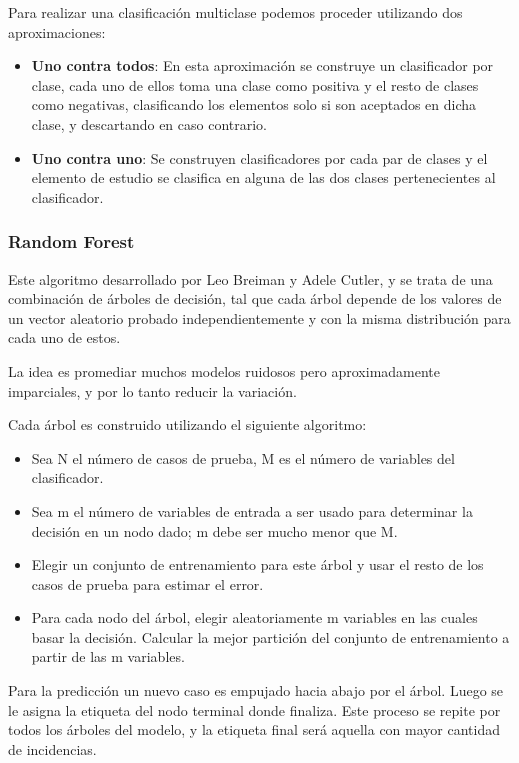 Para realizar una clasificación multiclase podemos proceder utilizando dos aproximaciones:

\begin{itemize}
	\item \textbf{Uno contra todos}: En esta aproximación se construye un clasificador por clase, cada uno de ellos toma una clase como positiva y el resto de clases como negativas, clasificando los elementos solo si son aceptados en dicha clase, y descartando en caso contrario.
	\item \textbf{Uno contra uno}: Se construyen clasificadores por cada par de clases y el elemento de estudio se clasifica en alguna de las dos clases pertenecientes al clasificador.
\end{itemize}

\subsubsection{Random Forest}\label{rf}

Este algoritmo desarrollado por Leo Breiman y Adele Cutler, y se trata de una combinación de árboles de decisión, tal que cada árbol depende de los valores de un vector aleatorio probado independientemente y con la misma distribución para cada uno de estos.

La idea es promediar muchos modelos ruidosos pero aproximadamente imparciales, y por lo tanto reducir la variación.

Cada árbol es construido utilizando el siguiente algoritmo:
\begin{itemize}
	\item Sea N el número de casos de prueba, M es el número de variables del clasificador.
	\item Sea m el número de variables de entrada a ser usado para determinar la decisión en un nodo dado; m debe ser mucho menor que M.
	\item Elegir un conjunto de entrenamiento para este árbol y usar el resto de los casos de prueba para estimar el error.
	\item Para cada nodo del árbol, elegir aleatoriamente m variables en las cuales basar la decisión. Calcular la mejor partición del conjunto de entrenamiento a partir de las m variables.
\end{itemize}

Para la predicción un nuevo caso es empujado hacia abajo por el árbol. Luego se le asigna la etiqueta del nodo terminal donde finaliza. Este proceso se repite por todos los árboles del modelo, y la etiqueta final será aquella con mayor cantidad de incidencias.

